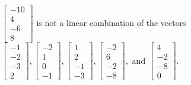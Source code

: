 \begin{exercise}
\begin{exerciseStatement}
  \end{exerciseStatement}
  \begin{exerciseAnswer}
   \(\left[\begin{array}{c}
-10 \\
4 \\
-6 \\
8
\end{array}\right]\) 
  	 is not  
	a linear combination of the vectors \(\left[\begin{array}{c}
-1 \\
-2 \\
-3 \\
2
\end{array}\right] , \left[\begin{array}{c}
-2 \\
1 \\
0 \\
-1
\end{array}\right] , \left[\begin{array}{c}
1 \\
2 \\
-1 \\
-3
\end{array}\right] , \left[\begin{array}{c}
-2 \\
6 \\
-2 \\
-8
\end{array}\right] , \text{ and } \left[\begin{array}{c}
4 \\
-2 \\
-8 \\
0
\end{array}\right]\).

	
  


  \end{exerciseAnswer}
\end{exercise}